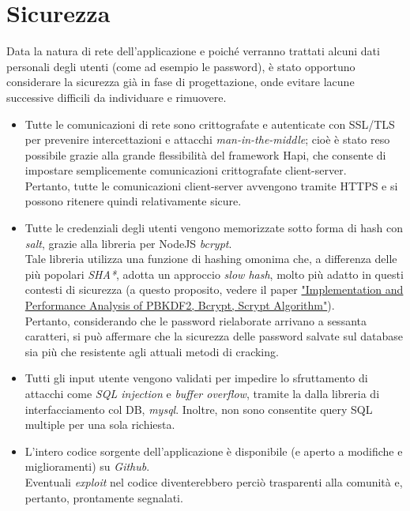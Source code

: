\documentclass[11pt]{report}
\begin{document}
\section{Sicurezza}
Data la natura di rete dell'applicazione e poiché verranno trattati alcuni dati personali degli utenti (come ad esempio le password), è stato opportuno considerare la sicurezza già in fase di progettazione, onde evitare lacune successive difficili da individuare e rimuovere.
\begin{itemize}
	\item Tutte le comunicazioni di rete sono crittografate e autenticate con SSL/TLS per prevenire intercettazioni e attacchi \textit{man-in-the-middle}; cioè è stato reso possibile grazie alla grande flessibilità del framework Hapi, che consente di impostare semplicemente comunicazioni crittografate client-server.
	\\Pertanto, tutte le comunicazioni client-server avvengono tramite HTTPS e si possono ritenere quindi relativamente sicure.
	\item Tutte le credenziali degli utenti vengono memorizzate sotto forma di hash con \textit{salt}, grazie alla libreria per NodeJS \textit{bcrypt}.
	\\Tale libreria utilizza una funzione di hashing omonima che, a differenza delle più popolari \textit{SHA*}, adotta un approccio \textit{slow hash}, molto più adatto in questi contesti di sicurezza (a questo proposito, vedere il paper \href{http://worldcomp-proceedings.com/proc/p2016/ICW3865.pdf}{"Implementation and Performance Analysis of PBKDF2, Bcrypt, Scrypt Algorithm"}).
	\\Pertanto, considerando che le password rielaborate arrivano a sessanta caratteri, si può affermare che la sicurezza delle password salvate sul database sia più che resistente agli attuali metodi di cracking.
	\item Tutti gli input utente vengono validati per impedire lo sfruttamento di attacchi come \textit{SQL injection} e \textit{buffer overflow}, tramite la dalla libreria di interfacciamento col DB, \textit{mysql}. Inoltre, non sono consentite query SQL multiple per una sola richiesta.
	\item L'intero codice sorgente dell'applicazione è disponibile (e aperto a modifiche e miglioramenti) su \textit{Github}.
	\\Eventuali \textit{exploit} nel codice diventerebbero perciò trasparenti alla comunità e, pertanto, prontamente segnalati.
\end{itemize}
\pagebreak
\end{document}
